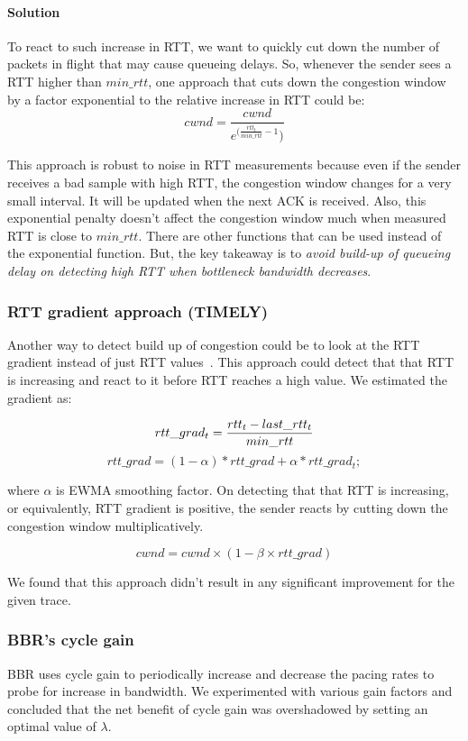 \documentclass{article}
\begin{document}
\paragraph{Solution} To react to such increase in RTT, we want to
quickly cut down the number of packets in flight that may cause
queueing delays. So, whenever the sender sees a RTT higher than
$min\_rtt$, one approach that cuts down the congestion window by a
factor exponential to the relative increase in RTT could be:
\[
  cwnd = \frac{cwnd}{e^{(\frac{rtt_t}{min\_rtt} - 1})}
\]

This approach is robust to noise in RTT measurements because even if
the sender receives a bad sample with high RTT, the congestion window
changes for a very small interval. It will be updated when the next
ACK is received. Also, this exponential penalty doesn't affect the
congestion window much when measured RTT is close to $min\_rtt$. There
are other functions that can be used instead of the exponential
function. But, the key takeaway is to \emph{avoid build-up of queueing delay
on detecting high RTT when bottleneck bandwidth decreases}.

\subsubsection{RTT gradient approach (TIMELY)}
Another way to detect build up of congestion could be to look at the
RTT gradient instead of just  RTT values~\cite{timely}. This
approach could detect that that RTT is increasing and react to it
before RTT reaches a high value. We estimated the gradient as:

\[
  rtt\_grad_t = \frac{rtt_t - last\_rtt_t}{min\_rtt} \\
\]
\[
  rtt\_grad = (1 - \alpha) * rtt\_grad + \alpha * rtt\_grad_t;
\]

where $\alpha$ is EWMA smoothing factor.
On detecting that that RTT is increasing, or equivalently, RTT
gradient is positive, the sender reacts by cutting down the congestion
window multiplicatively.

\[
  cwnd = cwnd \times ( 1 - \beta \times rtt\_grad)
\]

We found that this approach didn't result in any significant
improvement for the given trace.

\subsubsection{BBR's cycle gain}
BBR uses cycle gain to periodically increase and decrease the pacing
rates to probe for increase in bandwidth. We experimented with various
gain factors and concluded that the net benefit of cycle gain was
overshadowed by setting an optimal value of $\lambda$.
\end{document}
